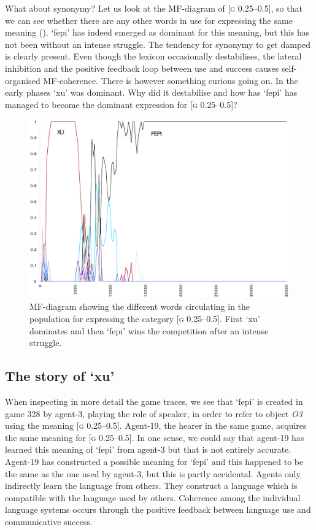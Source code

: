 What about synonymy? Let us look at the 
MF-diagram of [\textsc{g} 0.25–0.5], so that we can
see whether there are any other words in use for expressing
the same meaning ().
`fepi' has indeed emerged as dominant for this meaning, but 
this has not been without an intense struggle.
The tendency for synonymy to get damped is clearly present. 
Even though the lexicon occasionally destabilises, 
the lateral inhibition and the positive feedback loop between use 
and success causes self-organised MF-coherence. 
There is however something curious going on. 
In the early phases `xu' was dominant. Why did it 
destabilise and how has `fepi' has managed to become the
dominant expression for [\textsc{g} 0.25–0.5]? 

\begin{figure}[htbp]
  \centerline{\includegraphics[width=.80\textwidth]{chap7/figs/MF-G-025-050.pdf}}
\caption{\label{g02505.f}MF-diagram showing the
different words circulating in the population for expressing
the category [\textsc{g} 0.25–0.5]. First `xu' dominates and 
then `fepi' wins the competition after an intense struggle.}
\end{figure}

\subsection{The story of `xu'}

When inspecting in more detail the game traces,
we see that `fepi' is created in game 328 by agent-3, playing the
role of speaker, in order to refer to object \emph{O3} using 
the meaning [\textsc{g} 0.25–0.5]. Agent-19, the hearer in the same 
game, acquires the same meaning for [\textsc{g} 0.25–0.5]. In one sense,
we could say that agent-19 has learned this meaning of `fepi' from
agent-3 but that is not entirely accurate. Agent-19 
has constructed a possible meaning for `fepi' and this happened
to be the same as the one used by agent-3,
but this is partly accidental. 
Agents only indirectly learn the language from others. They construct
a language which is compatible with the language used by others. 
Coherence among the individual
language systems occurs through the positive feedback between
language use and communicative success.

